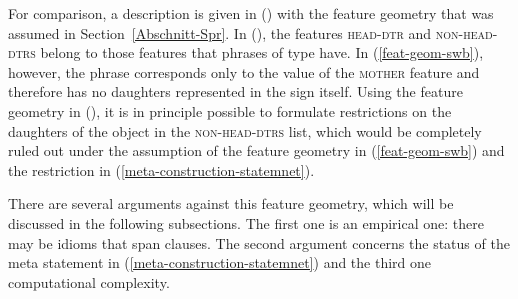 \noindent
For comparison, a description is given in () with the feature geometry that was assumed in Section~\ref{Abschnitt-Spr}.
\ea
{}
\z
In (), the features \textsc{head-dtr} and \textsc{non-head-dtrs} belong to those features that phrases of type 
 have. In (\ref{feat-geom-swb}), however, the phrase corresponds only
to the value of the \textsc{mother} feature and therefore has no daughters represented in the sign itself.
Using the feature geometry in (), it is in principle possible to formulate restrictions on the daughters of the object
in the \textsc{non-head-dtrs} list, which would be completely ruled out under the assumption of the
feature geometry in (\ref{feat-geom-swb}) and the restriction in (\ref{meta-construction-statemnet}).

\addlines
There are several arguments against this feature geometry, which will be discussed in the following
subsections. The first one is an empirical one: there may be idioms that span clauses. The second
argument concerns the status of the meta statement in (\ref{meta-construction-statemnet}) and the
third one computational complexity.

